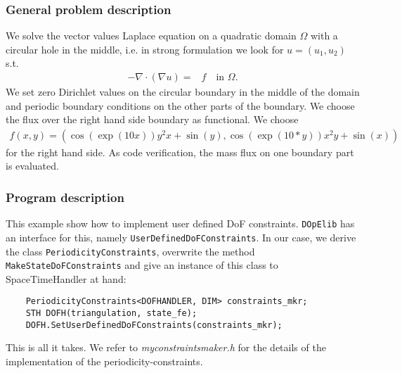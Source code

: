\subsubsection{General problem description}
We solve the vector values Laplace equation on a quadratic domain $\Omega$ with a circular hole in the middle, i.e. in strong formulation we look for $u=(u_1,u_2)$ s.t.
\begin{align*}
-\nabla \cdot (\nabla u) =& f \quad\text{in }\Omega.
\end{align*}
We set zero Dirichlet values on the circular boundary in the middle of the domain and periodic boundary conditions on the other parts of the boundary. We choose the flux over the right hand side boundary as functional. We choose
\begin{align*}
f(x,y) = \left(\cos\left(\exp(10  x)\right)  y^2x + \sin(y), \cos\left(\exp(10 * y)\right)x^2y + \sin(x)\right)
\end{align*}
for the right hand side. As code verification, the mass flux on 
one boundary part is evaluated.



\subsubsection{Program description}
This example show how to implement user defined DoF constraints. \texttt{DOpElib} has an interface for this, namely \texttt{UserDefinedDoFConstraints}. In our case, we derive the class \texttt{PeriodicityConstraints}, overwrite the method \texttt{MakeStateDoFConstraints} and give an instance of this class to SpaceTimeHandler at hand:
\begin{verbatim}
 	PeriodicityConstraints<DOFHANDLER, DIM> constraints_mkr;
 	STH DOFH(triangulation, state_fe);
 	DOFH.SetUserDefinedDoFConstraints(constraints_mkr);
\end{verbatim}
This is all it takes. We refer to \textit{myconstraintsmaker.h} for the details of the implementation of the periodicity-constraints.
